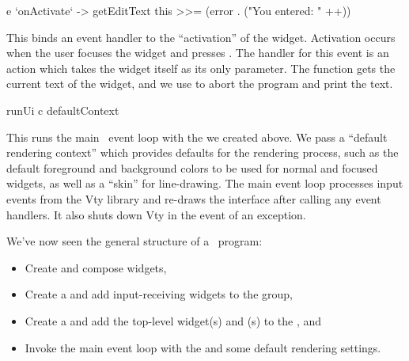 \begin{haskellcode}
 e `onActivate` \this -> getEditText this >>=
   (error . ("You entered: " ++))
\end{haskellcode}

This binds an event handler to the ``activation'' of the 
widget.  Activation occurs when the user focuses the  widget
and presses .  The handler for this event is an 
action which takes the  widget itself as its only parameter.
The  function gets the current text of the 
widget, and we use  to abort the program and print the text.

\begin{haskellcode}
 runUi c defaultContext
\end{haskellcode}

This runs the main \vtyui\ event loop with the  we
created above.  We pass a ``default rendering context'' which provides
defaults for the rendering process, such as the default foreground and
background colors to be used for normal and focused widgets, as well
as a “skin” for line-drawing.  The main event loop processes input
events from the Vty library and re-draws the interface after calling
any event handlers.  It also shuts down Vty in the event of an
exception.

We've now seen the general structure of a \vtyui\ program:
\begin{itemize}
\item Create and compose widgets,
\item Create a  and add input-receiving widgets to the
  group,
\item Create a  and add the top-level widget(s) and
  (s) to the , and
\item Invoke the main event loop with the  and some
  default rendering settings.
\end{itemize}
